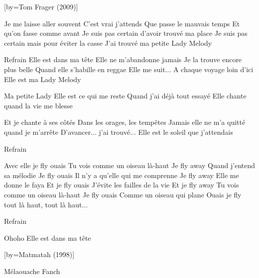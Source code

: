 [by={Tom Frager (2009)}]

\beginverse
Je me laisse aller souvent
C'est vrai j'attends
Que passe le mauvais temps
Et qu'on fasse comme avant
Je suis pas certain d'avoir trouvé ma place
Je suis pas certain mais pour éviter la casse
J'ai trouvé ma petite Lady Melody
\endverse

\beginverse
Refrain
Elle est dans ma tête
Elle ne m'abandonne jamais
Je la trouve encore plus belle
Quand elle s'habille en reggae
Elle me suit...
A chaque voyage loin d'ici
Elle est ma Lady Melody
\endverse

\beginverse
Ma petite Lady
Elle est ce qui me reste
Quand j'ai déjà tout essayé
Elle chante quand la vie me blesse
\endverse

\beginverse
Et je chante à ses côtés
Dans les orages, les tempêtes
Jamais elle ne m'a quitté quand je m'arrête
D'avancer... j'ai trouvé...
Elle est le soleil que j'attendais
\endverse

\beginverse
Refrain
\endverse

\beginverse
Avec elle je fly ouais
Tu vois comme un oiseau là-haut
Je fly away
Quand j'entend sa mélodie
Je fly ouais
Il n'y a qu'elle qui me comprenne
Je fly away
Elle me donne le faya
Et je fly ouais
J'évite les failles de la vie
Et je fly away
Tu vois comme un oiseau là-haut
Je fly ouais
Comme un oiseau qui plane
Ouais je fly tout là haut, tout là haut...
\endverse

\beginverse
Refrain\\[2x]
\endverse

\beginverse
Ohoho
Elle est dans ma tête
\endverse

[by={Matmatah (1998)}]

\beginverse
Mélaouache Fanch \!
\endverse

